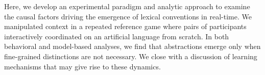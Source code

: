\documentclass[10pt,letterpaper]{article}
\newcommand{\ndg}[1]{\textcolor{Green}{[ndg: #1]}}
\begin{document}
Here, we develop an experimental paradigm and analytic approach to examine the causal factors driving the emergence of lexical conventions in real-time. 
We manipulated context in a repeated reference game where pairs of participants interactively coordinated on an artificial language from scratch. %
In both behavioral and model-based analyses, we find that abstractions emerge only when fine-grained distinctions are not necessary. We close with a discussion of learning mechanisms that may give rise to these dynamics.






			
\end{document}
